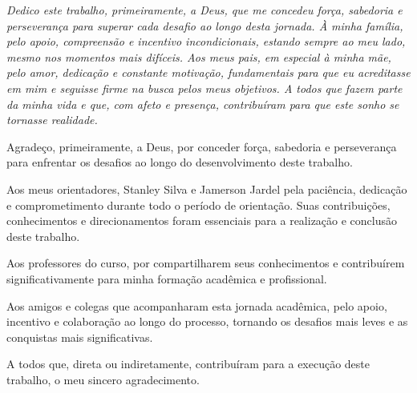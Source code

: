 \documentclass[
	12pt,				%
	twoside,			%
	a4paper,			%
	chapter=TITLE,		%
	section=TITLE,		%
	subsection=TITLE,	%
	subsubsection=TITLE,%
	english,			%
	french,				%
	spanish,			%
	brazilian,			%
	]{abntex2}
\date{\normalsize\today} %
\begin{document}
\frenchspacing          %

\pretextual

\imprimircapa                   

\imprimirfolhaderosto

\newpage

\begin{dedicatoria}
   \vspace*{\fill}
   \centering
   \noindent
   \textit{Dedico este trabalho, primeiramente, a Deus, que me concedeu força, sabedoria e perseverança para superar cada desafio ao longo desta jornada.
À minha família, pelo apoio, compreensão e incentivo incondicionais, estando sempre ao meu lado, mesmo nos momentos mais difíceis.
Aos meus pais, em especial à minha mãe, pelo amor, dedicação e constante motivação, fundamentais para que eu acreditasse em mim e seguisse firme na busca pelos meus objetivos.
A todos que fazem parte da minha vida e que, com afeto e presença, contribuíram para que este sonho se tornasse realidade.
} 
   \vspace*{\fill}
\end{dedicatoria}

\begin{agradecimentos}
Agradeço, primeiramente, a Deus, por conceder força, sabedoria e perseverança para enfrentar os desafios ao longo do desenvolvimento deste trabalho.

Aos meus orientadores, Stanley Silva e Jamerson Jardel pela paciência, dedicação e comprometimento durante todo o período de orientação. Suas contribuições, conhecimentos e direcionamentos foram essenciais para a realização e conclusão deste trabalho.

Aos professores do curso, por compartilharem seus conhecimentos e contribuírem significativamente para minha formação acadêmica e profissional.

Aos amigos e colegas que acompanharam esta jornada acadêmica, pelo apoio, incentivo e colaboração ao longo do processo, tornando os desafios mais leves e as conquistas mais significativas.

A todos que, direta ou indiretamente, contribuíram para a execução deste trabalho, o meu sincero agradecimento.

\end{agradecimentos}
\end{document}
